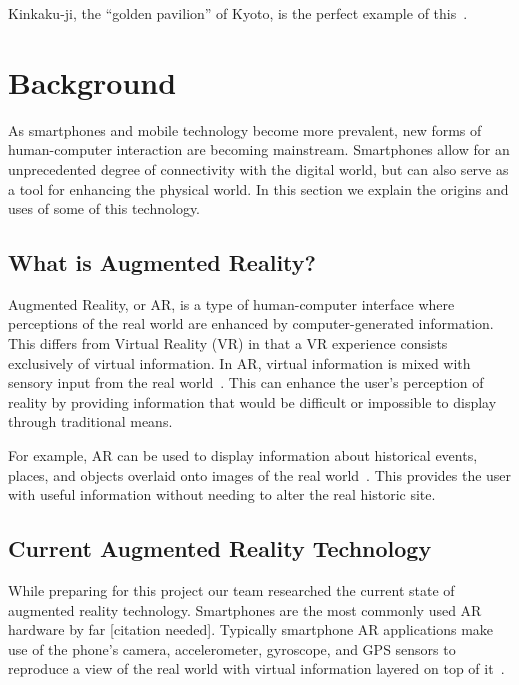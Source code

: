 \documentclass[a4paper, 10pt, american, titlepage]{article}
\begin{document}
Kinkaku-ji, the ``golden pavilion'' of Kyoto, is the perfect example of
this~\autocite{bornoff2000}.

\newpage

\section{Background}
\label{sec:background}

As smartphones and mobile technology become more prevalent, new forms of
human-computer interaction are becoming mainstream. Smartphones allow for an
unprecedented degree of connectivity with the digital world, but can also serve
as a tool for enhancing the physical world. In this section we explain the
origins and uses of some of this technology.

\subsection{What is Augmented Reality?}
\label{sec:whatIsAugmentedReality}

Augmented Reality, or AR, is a type of human-computer interface where
perceptions of the real world are enhanced by computer-generated information.
This differs from Virtual Reality (VR) in that a VR experience consists
exclusively of virtual information. In AR, virtual information is mixed with
sensory input from the real world~\autocite{carmigniani2011}. This can enhance
the user's perception of reality by providing information that would be
difficult or impossible to display through traditional means.

For example, AR can be used to display information about historical events,
places, and objects overlaid onto images of the real
world~\autocite{saenz2009}.  This provides the user with useful information
without needing to alter the real historic site.

\subsection{Current Augmented Reality Technology}
\label{sec:currentAugmentedRealityTechnology}

While preparing for this project our team researched the current state of
augmented reality technology. Smartphones are the most commonly used AR
hardware by far [citation needed]. Typically smartphone AR applications make
use of the phone's camera, accelerometer, gyroscope, and GPS sensors to
reproduce a view of the real world with virtual information layered on top of
it~\autocite{bonsor2018}.
\end{document}
